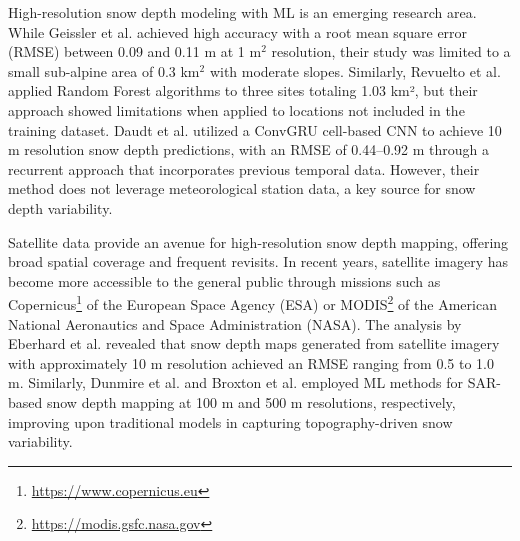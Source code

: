 \documentclass[preprint,12pt]{elsarticle}
\begin{document}
High-resolution snow depth modeling with ML is an emerging research area. While Geissler et al. \cite{Geissler2023} achieved high accuracy with a root mean square error (RMSE) between 0.09 and 0.11 m at 1 m$^2$ resolution, their study was limited to a small sub-alpine area of 0.3 km$^2$ with moderate slopes. Similarly, Revuelto et al. \cite{revuelto2020random} applied Random Forest algorithms to three sites totaling 1.03 km², but their approach showed limitations when applied to locations not included in the training dataset. Daudt et al. \cite{daudt2023snow} utilized a ConvGRU cell-based CNN to achieve 10 m resolution snow depth predictions, with an RMSE of 0.44--0.92 m through a recurrent approach that incorporates previous temporal data. However, their method does not leverage meteorological station data, a key source for snow depth variability. %

Satellite data provide an avenue for high-resolution snow depth mapping, offering broad spatial coverage and frequent revisits. In recent years, satellite imagery has become more accessible to the general public through missions such as Copernicus\footnote{\url{https://www.copernicus.eu}} of the European Space Agency (ESA) or MODIS\footnote{\url{https://modis.gsfc.nasa.gov}} of the American National Aeronautics and Space Administration (NASA). The analysis by Eberhard et al. \cite{eberhard2021intercomparison} revealed that snow depth maps generated from satellite imagery with approximately 10 m resolution achieved an RMSE ranging from 0.5 to 1.0 m. Similarly, Dunmire et al. \cite{dunmire2024machine} and Broxton et al. \cite{broxton2024improving} employed ML methods for SAR-based snow depth mapping at 100 m and 500 m resolutions, respectively, improving upon traditional models in capturing topography-driven snow variability. %
\end{document}
